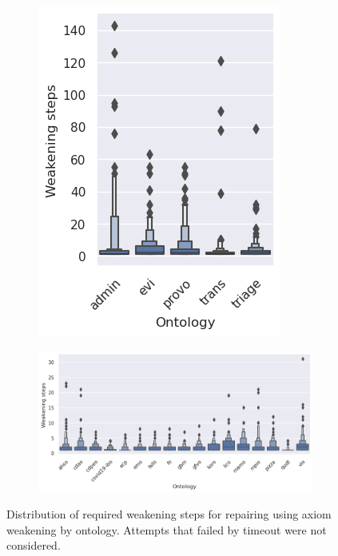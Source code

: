\begin{figure}[htbp]
  \centering
  \begin{subfigure}[T]{0.25\textwidth}
    \includegraphics[width=\textwidth]{resources/steps-ontology-violin-1.png}
  \end{subfigure}
  \begin{subfigure}[T]{0.715\textwidth}
    \includegraphics[width=\textwidth]{resources/steps-ontology-violin-2.png}
  \end{subfigure}
  \caption{Distribution of required weakening steps for repairing using axiom weakening by ontology. Attempts that failed by timeout were not considered.}
\end{figure}

